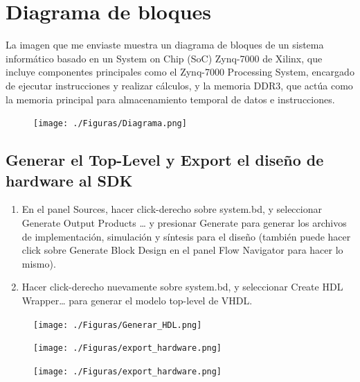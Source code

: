 \documentclass[12pt,a4paper, twoside]{article} %
\begin{document}
\section{Diagrama de bloques }

La imagen que me enviaste muestra un diagrama de bloques de un sistema informático basado en un System on Chip (SoC) Zynq-7000 de Xilinx, que incluye componentes principales como el Zynq-7000 Processing System, encargado de ejecutar instrucciones y realizar cálculos, y la memoria DDR3, que actúa como la memoria principal para almacenamiento temporal de datos e instrucciones.

\begin{figure}[ht]
\centering
\texttt{[image: ./Figuras/Diagrama.png]}
\label{fig:Diagrama de bloques}
\end{figure}


\subsection{Generar el Top-Level y Export el diseño de hardware al SDK}

\begin{enumerate}
    \item En el panel Sources, hacer click-derecho sobre system.bd, y seleccionar Generate Output Products … y presionar Generate para generar los archivos de implementación, simulación y síntesis para el diseño (también puede hacer click sobre Generate Block Design en el panel Flow Navigator para hacer lo mismo).
    \item Hacer click-derecho nuevamente sobre system.bd, y seleccionar Create HDL Wrapper… para generar el modelo top-level de VHDL.
\end{enumerate}

\begin{figure}[ht]
\centering
\texttt{[image: ./Figuras/Generar\_HDL.png]}
\label{fig:Generar HDL}
\end{figure}

\begin{figure}[ht]
\centering
\texttt{[image: ./Figuras/export\_hardware.png]}
\label{fig:Generar HDL}
\end{figure}

\begin{figure}[ht]
\centering
\texttt{[image: ./Figuras/export\_hardware.png]}
\label{fig:Generar HDL}
\end{figure}
\end{document}

